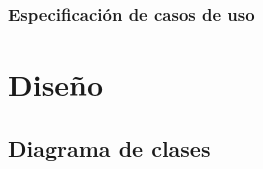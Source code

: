 \documentclass[]{article}
\begin{document}
	
	\newpage		
		\subsubsection{Especificación de casos de uso}
			
			
			
			
			
			
			
			
			
			
			
			
			
			
			
			
			
			
			
			
			
			
			
			
			
			
			

			
			
			
			
			
			
			

\section{Diseño}
	\subsection{Diagrama de clases}
\end{document}
